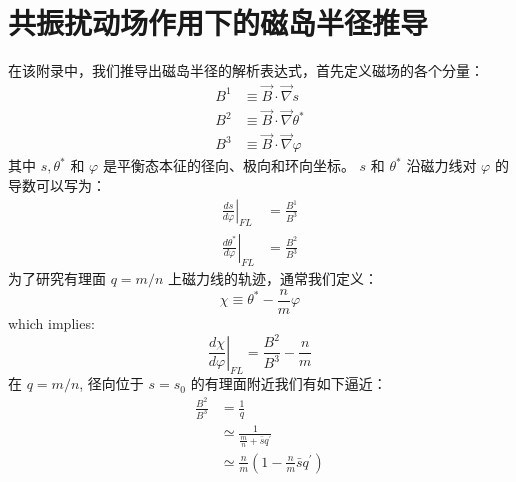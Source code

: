 
\chapter{共振扰动场作用下的磁岛半径推导}

在该附录中，我们推导出磁岛半径的解析表达式，首先定义磁场的各个分量：
\[
\begin{aligned}
B^{1} & \equiv \vec{B} \cdot \vec{\nabla} s \\
B^{2} & \equiv \vec{B} \cdot \vec{\nabla} \theta^{*} \\
B^{3} & \equiv \vec{B} \cdot \vec{\nabla} \varphi
\end{aligned}
\]
其中 $s, \theta^{*}$ 和 $\varphi$ 是平衡态本征的径向、极向和环向坐标。 $s$ 和 $\theta^{*}$ 沿磁力线对 $\varphi$ 的导数可以写为：
\[
\begin{aligned}
\left.\frac{d s}{d \varphi}\right|_{F L} &=\frac{B^{1}}{B^{3}} \\
\left.\frac{d \theta^{*}}{d \varphi}\right|_{F L} &=\frac{B^{2}}{B^{3}}
\end{aligned}
\]
为了研究有理面 $q=m/n$  上磁力线的轨迹，通常我们定义：
\[
\chi \equiv \theta^{*}-\frac{n}{m} \varphi
\]
which implies:
\[
\left.\frac{d \chi}{d \varphi}\right|_{F L}=\frac{B^{2}}{B^{3}}-\frac{n}{m}
\]
在 $q=m/n$, 径向位于 $s=s_{0}$ 的有理面附近我们有如下逼近： 
\[
\begin{aligned}
\frac{B^{2}}{B^{3}} &=\frac{1}{q} \\
& \simeq \frac{1}{\frac{m}{n}+\bar{s} q^{\prime}} \\
& \simeq \frac{n}{m}\left(1-\frac{n}{m} \bar{s} q^{\prime}\right)
\end{aligned}
\]

